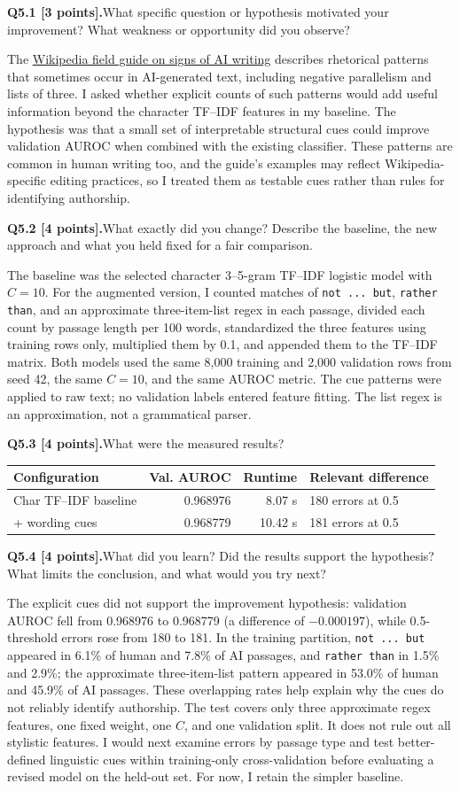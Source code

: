 \documentclass[11pt,letterpaper]{article}
\newcommand{\question}[2]{\needspace{4\baselineskip}\par\addvspace{0.45em}\noindent\textbf{#1}\quad #2\par\nobreak\vspace{0.1em}}
\begin{document}
\question{Q5.1 [3 points].}{What specific question or hypothesis motivated your improvement? What weakness or opportunity did you observe?}
The \href{https://en.wikipedia.org/wiki/Wikipedia:Signs_of_AI_writing}{Wikipedia field guide on signs of AI writing} describes rhetorical patterns that sometimes occur in AI-generated text, including negative parallelism and lists of three. I asked whether explicit counts of such patterns would add useful information beyond the character TF--IDF features in my baseline. The hypothesis was that a small set of interpretable structural cues could improve validation AUROC when combined with the existing classifier. These patterns are common in human writing too, and the guide's examples may reflect Wikipedia-specific editing practices, so I treated them as testable cues rather than rules for identifying authorship.
\question{Q5.2 [4 points].}{What exactly did you change? Describe the baseline, the new approach and what you held fixed for a fair comparison.}
The baseline was the selected character 3--5-gram TF--IDF logistic model with $C=10$. For the augmented version, I counted matches of \texttt{not ... but}, \texttt{rather than}, and an approximate three-item-list regex in each passage, divided each count by passage length per 100 words, standardized the three features using training rows only, multiplied them by 0.1, and appended them to the TF--IDF matrix. Both models used the same 8,000 training and 2,000 validation rows from seed 42, the same $C=10$, and the same AUROC metric. The cue patterns were applied to raw text; no validation labels entered feature fitting. The list regex is an approximation, not a grammatical parser.
\question{Q5.3 [4 points].}{What were the measured results?}
\begin{tabularx}{\linewidth}{@{}YrrY@{}}\toprule Configuration & Val. AUROC & Runtime & Relevant difference \\ \midrule Char TF--IDF baseline & 0.968976 & 8.07 s & 180 errors at 0.5 \\ + wording cues & 0.968779 & 10.42 s & 181 errors at 0.5 \\ \bottomrule\end{tabularx}
\question{Q5.4 [4 points].}{What did you learn? Did the results support the hypothesis? What limits the conclusion, and what would you try next?}
The explicit cues did not support the improvement hypothesis: validation AUROC fell from 0.968976 to 0.968779 (a difference of $-0.000197$), while 0.5-threshold errors rose from 180 to 181. In the training partition, \texttt{not ... but} appeared in 6.1\% of human and 7.8\% of AI passages, and \texttt{rather than} in 1.5\% and 2.9\%; the approximate three-item-list pattern appeared in 53.0\% of human and 45.9\% of AI passages. These overlapping rates help explain why the cues do not reliably identify authorship. The test covers only three approximate regex features, one fixed weight, one $C$, and one validation split. It does not rule out all stylistic features. I would next examine errors by passage type and test better-defined linguistic cues within training-only cross-validation before evaluating a revised model on the held-out set. For now, I retain the simpler baseline.
\end{document}
